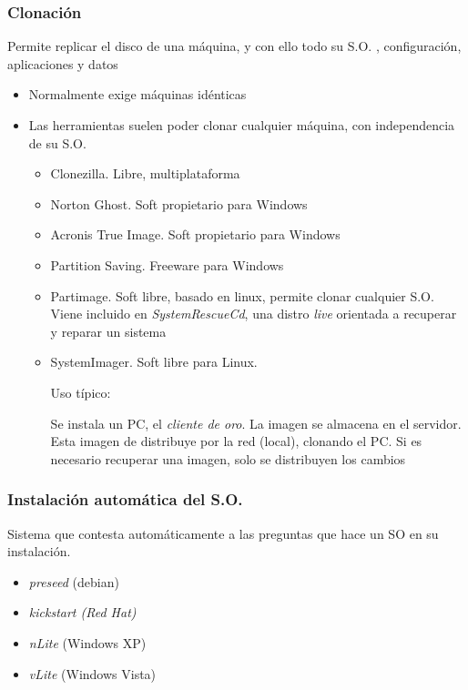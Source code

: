 \documentclass[ucs]{beamer}
\begin{document}

\begin{frame}[fragile]
\frametitle{Clonación}
Permite replicar el disco de una máquina, y con ello todo su S.O. , configuración, aplicaciones y datos
\begin{itemize}
\item
Normalmente exige máquinas idénticas 
\item
Las herramientas suelen poder clonar cualquier máquina, con independencia de su S.O.
\begin{itemize}
\item Clonezilla. Libre, multiplataforma
\item Norton Ghost. Soft propietario para Windows
\item Acronis True Image.  Soft propietario para Windows
\item Partition Saving. Freeware para Windows
\item Partimage. Soft libre, basado en linux, permite clonar cualquier S.O.
Viene incluido en \emph{SystemRescueCd}, una distro \emph{live} orientada a 
recuperar y reparar un sistema
\item SystemImager. Soft libre para Linux. 

Uso típico:
  \begin{footnotesize}
Se instala un PC, el \emph{cliente de oro}. La imagen
se almacena en el servidor. Esta imagen de distribuye por la red (local), clonando
el PC. Si es necesario recuperar una imagen, solo se distribuyen los cambios
  \end{footnotesize}
\end{itemize}

\end{itemize}

\end{frame}

\begin{frame}[fragile]
\frametitle{Instalación automática del S.O.}
Sistema que contesta automáticamente a las preguntas que hace un SO en su instalación. 
\begin{itemize}
\item
\emph{preseed} (debian)
\item
\emph{kickstart (Red Hat)}
\item \emph{nLite} (Windows XP)
\item \emph{vLite} (Windows Vista)
\end{itemize}
\end{frame}
\end{document}
